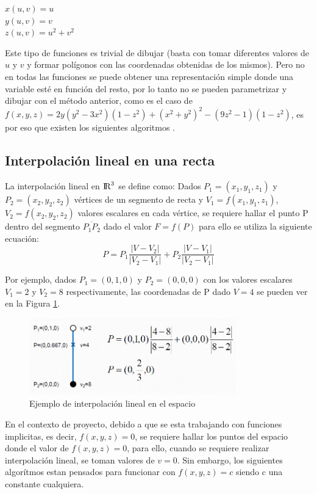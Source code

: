 \documentclass[12pt]{article}
\begin{document}
\begin{center}
$x(u,v) = u$\\
$y(u,v) = v$\\
$z(u,v) = u^2+v^2$\\
\end{center}

Este tipo de funciones es trivial de dibujar (basta con tomar diferentes valores de $u$ y $v$ y formar polígonos con las coordenadas obtenidas de los mismos).
Pero no en todas las funciones se puede obtener una representación simple donde una variable esté en función del resto, por lo tanto no se pueden parametrizar y dibujar con el método anterior, como es el caso de  $f(x,y,z) = 2y(y^2-3x^2)(1-z^2)+(x^2+y^2)^2-(9z^2-1)(1-z^2)$, es por eso que existen los siguientes algoritmos \cite{implicitas}.
\subsection{Interpolación lineal en una recta}
\noindent  La interpolación lineal en ${\rm I\!R} ^3$ se define como: Dados $P_1=(x_1,y_1,z_1)$ y $P_2=(x_2,y_2,z_2)$ vértices de un segmento de recta y $V_1=f(x_1,y_1,z_1)$, $V_2=f(x_2,y_2,z_2)$ valores escalares en cada vértice, se requiere hallar el punto P dentro del segmento $\overline{P_1 P_2}$ dado el valor $F=f(P)$ para ello se utiliza la siguiente ecuación: 
$$P=P_1 \dfrac{\vert V-V_2\vert}{\vert V_2-V_1\vert}+P_2 \dfrac{\vert V-V_1\vert}{\vert V_2-V_1\vert}$$

Por ejemplo, dados $P_1=(0, 1, 0)$ y $P_2=(0, 0, 0)$ con los valores escalares $V_1=2$ y $V_2=8$ respectivamente, las coordenadas de P dado $V=4$ se pueden ver en la Figura \ref{interpolacionlineal}.
\begin{figure}[h!]
\includegraphics[width=0.8\textwidth,center]{interpolacion_ejemplo.png}
\caption{Ejemplo de interpolación lineal en el espacio}
\label{interpolacionlineal}
\end{figure}
En el contexto de proyecto, debido a que se esta trabajando con funciones implicitas, es decir, $f(x,y,z)=0$, se requiere hallar los puntos del espacio donde el valor de $f(x,y,z)=0$, para ello, cuando se requiere realizar interpolación lineal, se toman valores de $v=0$. Sin embargo, los siguientes algorítmos estan pensados para funcionar con $f(x,y,z)=c$ siendo c una constante cualquiera.
\end{document}

